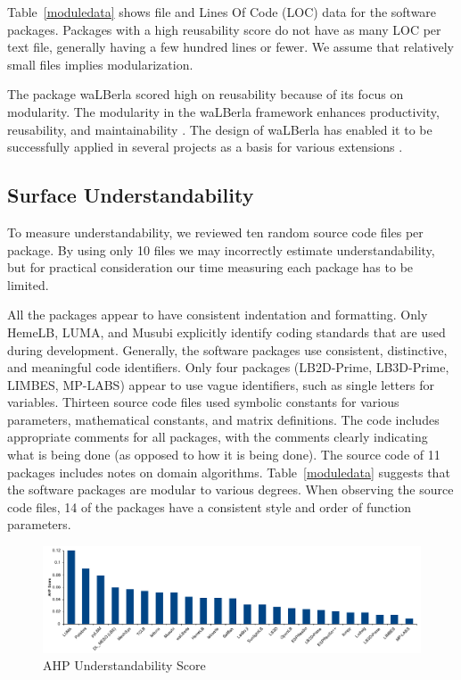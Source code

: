 \documentclass[final, 3p, times, authoryear]{elsarticle}
\begin{document}
Table~\ref{moduledata} shows file and Lines Of Code (LOC) data for the software
packages. Packages with a high reusability score do not have as many LOC per
text file, generally having a few hundred lines or fewer. We assume that
relatively small files implies modularization.

The package waLBerla scored high on reusability because of its focus on
modularity.  The modularity in the waLBerla framework enhances productivity,
reusability, and maintainability \citep{bauer2021walberla}. The design of
waLBerla has enabled it to be successfully applied in several projects as a
basis for various extensions \citep{bauer2021walberla}.

\subsection{Surface Understandability} \label{Sec_SurfUnderstandability}

To measure understandability, we reviewed ten random source code files per
package.  By using only 10 files we may incorrectly estimate understandability,
but for practical consideration our time measuring each package has to be
limited.

All the packages appear to have consistent indentation and formatting. Only
HemeLB, LUMA, and Musubi explicitly identify coding standards that are used
during development. Generally, the software packages use consistent,
distinctive, and meaningful code identifiers. Only four packages (LB2D-Prime,
LB3D-Prime, LIMBES, MP-LABS) appear to use vague identifiers, such as single
letters for variables. Thirteen source code files used symbolic constants for
various parameters, mathematical constants, and matrix definitions. The code
includes appropriate comments for all packages, with the comments clearly
indicating what is being done (as opposed to how it is being done). The source
code of 11 packages includes notes on domain algorithms. Table~\ref{moduledata}
suggests that the software packages are modular to various degrees. When
observing the source code files, 14 of the packages have a consistent style and
order of function parameters.

\begin{figure}[h!]
	\begin{center}
		\includegraphics[width=1.0\textwidth]{./figures/understandability_chart.pdf}
		\caption{AHP Understandability Score}
		\label{Fig_Understandability}
	\end{center}
\end{figure}
\end{document}
